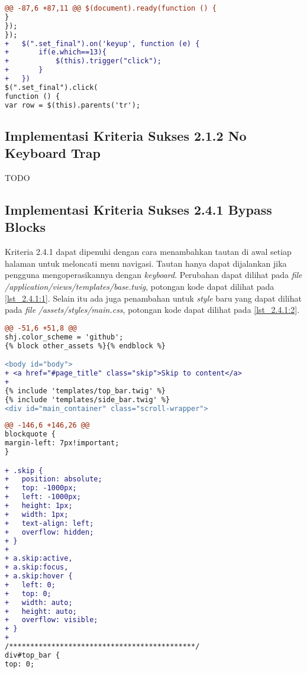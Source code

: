 \begin{itemize}
\begin{lstlisting}[language=diff, caption=Perubahan pada \textit{file} \textit{shj\_functions.js}, label=lst_2.1.1:13, basicstyle=\ttfamily, frame=single,
columns=fullflexible, keepspaces=true, breaklines=true]
@@ -87,6 +87,11 @@ $(document).ready(function () {
}
});
});
+ 	$(".set_final").on('keyup', function (e) {
+ 		if(e.which==13){
+ 			$(this).trigger("click");
+ 		}
+ 	})
$(".set_final").click(
function () {
var row = $(this).parents('tr');
\end{lstlisting}

\end{itemize}


\subsection{Implementasi Kriteria Sukses 2.1.2 No Keyboard Trap}
\label{subsec:implementasi_A_2.1.2}
TODO

\subsection{Implementasi Kriteria Sukses 2.4.1 Bypass Blocks}
\label{subsec:implementasi_A_2.4.1}

Kriteria 2.4.1 dapat dipenuhi dengan cara menambahkan tautan di awal setiap halaman untuk meloncati menu navigasi. Tautan hanya dapat dijalankan jika pengguna mengoperasikannya dengan \textit{keyboard}. Perubahan dapat dilihat pada \textit{file} \textit{/application/views/templates/base.twig}, potongan kode dapat dilihat pada \ref{lst_2.4.1:1}. Selain itu ada juga penambahan untuk \textit{style} baru yang dapat dilihat pada \textit{file} \textit{/assets/styles/main.css}, potongan kode dapat dilihat pada \ref{lst_2.4.1:2}.

\begin{lstlisting}[language=diff, caption=Perubahan pada \textit{file} \textit{base.twig}, label=lst_2.4.1:1, basicstyle=\ttfamily, frame=single,
columns=fullflexible, keepspaces=true, breaklines=true]
@@ -51,6 +51,8 @@ 
shj.color_scheme = 'github';
{% block other_assets %}{% endblock %}

<body id="body">
+ <a href="#page_title" class="skip">Skip to content</a>
+ 
{% include 'templates/top_bar.twig' %}
{% include 'templates/side_bar.twig' %}
<div id="main_container" class="scroll-wrapper">
\end{lstlisting}

\begin{lstlisting}[language=diff, caption=Penambahan \textit{style} untul kelas \textit{skip}, label=lst_2.4.1:2, basicstyle=\ttfamily, frame=single,
columns=fullflexible, keepspaces=true, breaklines=true]
@@ -146,6 +146,26 @@ 
blockquote {
margin-left: 7px!important;
}

+ .skip {
+ 	position: absolute;
+ 	top: -1000px;
+ 	left: -1000px;
+ 	height: 1px;
+ 	width: 1px;
+ 	text-align: left;
+ 	overflow: hidden;
+ }
+ 
+ a.skip:active, 
+ a.skip:focus, 
+ a.skip:hover {
+ 	left: 0; 
+ 	top: 0;
+ 	width: auto; 
+ 	height: auto; 
+ 	overflow: visible; 
+ }
+ 
/********************************************/
div#top_bar {
top: 0;
\end{lstlisting}

